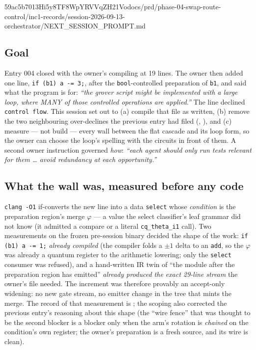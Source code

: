 %
  {59ac5b7}{013Hi5y8TF8WpYRVVqZH21Vo}{docs/prd/phase-04-swap-route-control/inc1-records/session-2026-09-13-orchestrator/NEXT\_SESSION\_PROMPT.md}

\subsection*{Goal}
Entry 004 closed with the owner's  compiling at 19 lines. The
owner then added one line, \texttt{if (b1) a -= 3;}, after the \texttt{bool}-controlled preparation of
\texttt{b1}, and said what the program is for: \emph{``the grover script might be implemented with a large
loop, where MANY of those controlled operations are applied.''} The line declined \texttt{control flow}.
This session set out to (a) compile that file as written, (b) remove the two neighbouring over-declines the
previous entry had filed (, ), and (c) measure --- not build --- every wall between the
flat cascade and its loop form, so the owner can choose the loop's spelling with the circuits in front of
them. A second owner instruction governed \emph{how}: \emph{``each agent should only run tests relevant for
them \ldots{} avoid redundancy at each opportunity.''}

\subsection*{What the wall was, measured before any code}
\texttt{clang -O1} if-converts the new line into a data \texttt{select} whose \emph{condition} is the
preparation region's merge \(\varphi\) --- a value the select classifier's leaf grammar did not know (it
admitted a compare or a literal \texttt{cq\_theta\_i1} call). Two measurements on the frozen pre-session
binary decided the shape of the work: \texttt{if (b1) a -= 1;} \emph{already compiled} (the compiler folds a
\(\pm1\) delta to an \texttt{add}, so the \(\varphi\) was already a quantum register to the arithmetic
lowering; only the \texttt{select} consumer was refused), and a hand-written IR twin of ``the module after
the preparation region has emitted'' \emph{already produced the exact 29-line stream} the owner's file
needed. The increment was therefore provably an accept-only widening: no new gate stream, no emitter change
in the tree that mints the merge. The record of that measurement is ; the scoping
also corrected the previous entry's reasoning about this shape (the ``wire fence'' that was thought to be
the second blocker is a blocker only when the arm's rotation is \emph{chained} on the condition's own
register; the owner's preparation is a fresh source, and its wire is clean).

